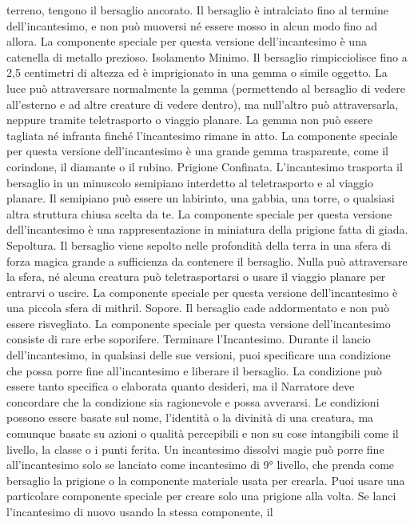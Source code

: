 \begin{multicols}{2}
terreno, tengono il bersaglio ancorato. Il bersaglio è
intralciato fino al termine dell’incantesimo, e non può
muoversi né essere mosso in alcun modo fino ad allora.
La componente speciale per questa versione
dell’incantesimo è una catenella di metallo prezioso.
Isolamento Minimo. Il bersaglio rimpicciolisce fino a
2,5 centimetri di altezza ed è imprigionato in una
gemma o simile oggetto. La luce può attraversare
normalmente la gemma (permettendo al bersaglio di
vedere all’esterno e ad altre creature di vedere dentro),
ma null’altro può attraversarla, neppure tramite
teletrasporto o viaggio planare. La gemma non può
essere tagliata né infranta finché l’incantesimo rimane
in atto.
La componente speciale per questa versione
dell’incantesimo è una grande gemma trasparente,
come il corindone, il diamante o il rubino.
Prigione Confinata. L’incantesimo trasporta il
bersaglio in un minuscolo semipiano interdetto al
teletrasporto e al viaggio planare. Il semipiano può
essere un labirinto, una gabbia, una torre, o qualsiasi
altra struttura chiusa scelta da te.
La componente speciale per questa versione
dell’incantesimo è una rappresentazione in miniatura
della prigione fatta di giada.
Sepoltura. Il bersaglio viene sepolto nelle profondità
della terra in una sfera di forza magica grande a
sufficienza da
contenere il bersaglio. Nulla può attraversare la sfera,
né alcuna creatura può teletrasportarsi o usare il
viaggio planare per entrarvi o uscire.
La componente speciale per questa versione
dell’incantesimo è una piccola sfera di mithril.
Sopore. Il bersaglio cade addormentato e non può
essere risvegliato. La componente speciale per questa
versione dell’incantesimo consiste di rare erbe
soporifere.
Terminare l’Incantesimo. Durante il lancio
dell’incantesimo, in qualsiasi delle sue versioni, puoi
specificare una condizione che possa porre fine
all’incantesimo e liberare il bersaglio. La condizione può
essere tanto specifica o elaborata quanto desideri, ma il
Narratore deve concordare che la condizione sia ragionevole
e possa avverarsi. Le condizioni possono essere
basate sul nome, l’identità o la divinità di una creatura,
ma comunque basate su azioni o qualità percepibili e
non su cose intangibili come il livello, la classe o i punti
ferita.
Un incantesimo dissolvi magie può porre fine
all’incantesimo solo se lanciato come incantesimo di 9°
livello, che prenda come bersaglio la prigione o la
componente materiale usata per crearla.
Puoi usare una particolare componente speciale per
creare solo una prigione alla volta. Se lanci
l’incantesimo di nuovo usando la stessa componente, il

\end{multicols}
